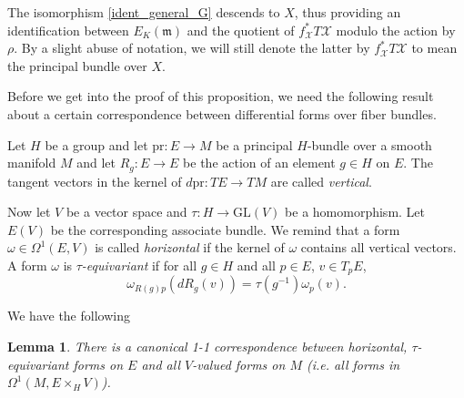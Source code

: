 \documentclass[oneside,11pt]{amsart}
\newtheorem{lem}[thm]{Lemma}
\theoremstyle{definition}
\theoremstyle{remark}
\numberwithin{thm}{section}
\numberwithin{equation}{section}
\begin{document}
The isomorphism \eqref{ident_general_G} descends to $X$, thus providing an identification between  $E_K(\mathfrak{m})$ and the quotient of $f^{*}_{\mathcal{X}} T\mathcal{X}$ modulo the action by $\rho$. By a slight abuse of notation, we will still denote the latter by $f^{*}_{\mathcal{X}} T\mathcal{X}$ to mean the principal bundle over $X$.

Before we get into the proof of this proposition, we need the following result about a certain correspondence between differential forms over fiber bundles.

Let $H$ be a group and let $\mathrm{pr}\colon E\to M$ be a principal $H$-bundle over a smooth manifold $M$ and let $R_g\colon E\to E$ be the action of an element  $g\in H$ on $E$. The tangent vectors in the kernel of $d\mathrm{pr}\colon TE\to TM$ are called \emph{vertical}. 


Now let $V$ be a vector space and $\tau\colon H\to \mathrm{GL}(V)$ be a homomorphism. Let $E(V)$ be the corresponding associate bundle. We remind that a form $\omega\in\Omega^1(E,V)$ is called \emph{horizontal} if the kernel of $\omega$ contains all vertical vectors. A form $\omega$ is \emph{$\tau$-equivariant} if for all $g\in H$ and all $p\in E$, $v\in T_pE$, 
$$\omega_{R(g)p}(dR_g(v))=\tau(g^{-1})\omega_p(v).$$ 




We have the following
\begin{lem}\label{lem:Maurer-Cartan_G}
There is a canonical 1-1 correspondence between horizontal, $\tau$-equivariant forms on $E$ and all $V$-valued forms on $M$ (i.e. all forms in $\Omega^1(M,E\times_H V)$).  
\end{lem}
\end{document}
